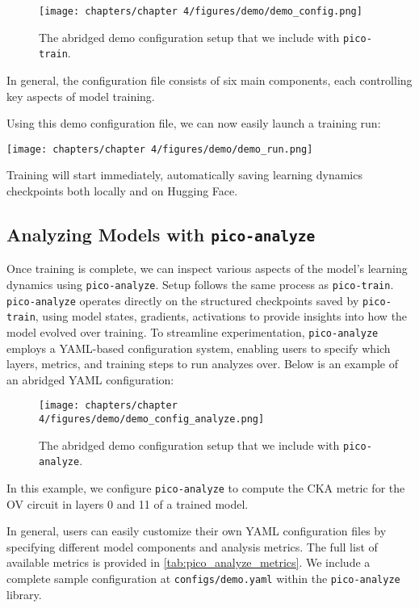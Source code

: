 \begin{figure}[h!] 
    \centering
    \texttt{[image: chapters/chapter 4/figures/demo/demo\_config.png]}
    \caption{The abridged demo configuration setup that we include with \texttt{pico-train}.}
    \label{fig:demo_config}
\end{figure}

In general, the configuration file consists of six main components, each controlling key aspects of model training. 

Using this demo configuration file, we can now easily launch a training run:

\begin{center}
    \texttt{[image: chapters/chapter 4/figures/demo/demo\_run.png]}
\end{center}

Training will start immediately, automatically saving learning dynamics checkpoints both locally and on Hugging Face.

\subsection{Analyzing Models with \texttt{pico-analyze}}

Once training is complete, we can inspect various aspects of the model’s learning dynamics using \texttt{pico-analyze}. Setup follows the same process as \texttt{pico-train}. \texttt{pico-analyze} operates directly on the structured checkpoints saved by \texttt{pico-train}, using model states, gradients, activations to provide insights into how the model evolved over training. To streamline experimentation, \texttt{pico-analyze} employs a YAML-based configuration system, enabling users to specify which layers, metrics, and training steps to run analyzes over. Below is an example of an abridged YAML configuration:

\begin{figure}[h!] 
    \centering
    \texttt{[image: chapters/chapter 4/figures/demo/demo\_config\_analyze.png]}
    \caption{The abridged demo configuration setup that we include with \texttt{pico-analyze}.}
    \label{fig:demo_analysis_config}
\end{figure}

In this example, we configure \texttt{pico-analyze} to compute the CKA metric for the OV circuit in layers 0 and 11 of a trained model.

In general, users can easily customize their own YAML configuration files by specifying different model components and analysis metrics. The full list of available metrics is provided in \cref{tab:pico_analyze_metrics}. We include a complete sample configuration at \texttt{configs/demo.yaml} within the \texttt{pico-analyze} library.

